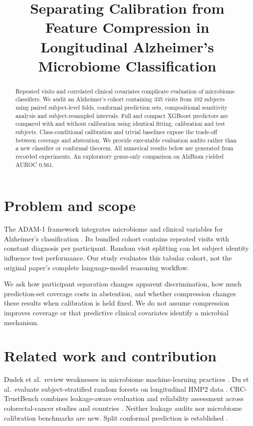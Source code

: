 \documentclass[manuscript,review,anonymous]{acmart}
\title{Separating Calibration from Feature Compression in Longitudinal Alzheimer's Microbiome Classification}
\begin{document}
\begin{abstract}
Repeated visits and correlated clinical covariates complicate evaluation of microbiome classifiers. We audit an Alzheimer's cohort containing 335 visits from 102 subjects using paired subject-level folds, conformal prediction sets, compositional sensitivity analysis and subject-resampled intervals. Full and compact XGBoost predictors are compared with and without calibration using identical fitting, calibration and test subjects. Class-conditional calibration and trivial baselines expose the trade-off between coverage and abstention. We provide executable evaluation audits rather than a new classifier or conformal theorem. All numerical results below are generated from recorded experiments. An exploratory genus-only comparison on AlzBiom yielded AUROC 0.561.
\end{abstract}
\maketitle
\section{Problem and scope}
The ADAM-1 framework integrates microbiome and clinical variables for Alzheimer's classification \cite{huang}. Its bundled cohort contains repeated visits with constant diagnosis per participant. Random visit splitting can let subject identity influence test performance. Our study evaluates this tabular cohort, not the original paper's complete language-model reasoning workflow.

We ask how participant separation changes apparent discrimination, how much prediction-set coverage costs in abstention, and whether compression changes these results when calibration is held fixed. We do not assume compression improves coverage or that predictive clinical covariates identify a microbial mechanism.

\section{Related work and contribution}
Dudek et al.\ review weaknesses in microbiome machine-learning practices \cite{dudek}. Du et al.\ evaluate subject-stratified random forests on longitudinal HMP2 data \cite{hmp2}. CRC-TrustBench combines leakage-aware evaluation and reliability assessment across colorectal-cancer studies and countries \cite{crc}. Neither leakage audits nor microbiome calibration benchmarks are new. Split conformal prediction is established \cite{angelopoulos}.
\end{document}
